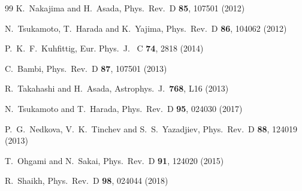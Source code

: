 \documentclass{article}
\begin{document}
\begin{small}
\begin{thebibliography}{99}
  K.~Nakajima and H.~Asada,
  Phys.\ Rev.\ D {\bf 85}, 107501 (2012)

  N.~Tsukamoto, T.~Harada and K.~Yajima,
  Phys.\ Rev.\ D {\bf 86}, 104062 (2012)

  P.~K.~F.~Kuhfittig,
  Eur. Phys.\ J. \ C {\bf 74},  2818 (2014)
 
  C.~Bambi,
  Phys.\ Rev.\ D {\bf 87}, 107501 (2013)

  R.~Takahashi and H.~Asada,
  Astrophys.\ J.\  {\bf 768}, L16 (2013)

  N.~Tsukamoto and T.~Harada,
  Phys.\ Rev.\ D {\bf 95},   024030 (2017)

  P.~G.~Nedkova, V.~K.~Tinchev and S.~S.~Yazadjiev,
  Phys.\ Rev.\ D {\bf 88},   124019 (2013)

  T.~Ohgami and N.~Sakai,
  Phys.\ Rev.\ D {\bf 91}, 124020 (2015)

  R.~Shaikh,
  Phys.\ Rev.\ D {\bf 98},  024044 (2018)


\end{thebibliography}
\end{small}
\end{document}
